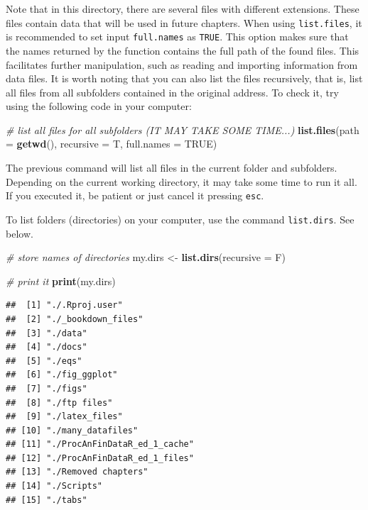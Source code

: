 \documentclass[11pt,]{book}
\newenvironment{Shaded}{\begin{snugshade}}{\end{snugshade}}
\newcommand{\KeywordTok}[1]{\textcolor[rgb]{0.27,0.27,0.27}{\textbf{#1}}}
\newcommand{\DataTypeTok}[1]{\textcolor[rgb]{0.27,0.27,0.27}{#1}}
\newcommand{\StringTok}[1]{\textcolor[rgb]{0.5,0.5,0.5}{#1}}
\newcommand{\CommentTok}[1]{\textcolor[rgb]{0.56,0.35,0.01}{\textit{#1}}}
\newcommand{\OtherTok}[1]{\textcolor[rgb]{0.56,0.35,0.01}{#1}}
\newcommand{\NormalTok}[1]{#1}
\begin{document}
Note that in this directory, there are several files with different
extensions. These files contain data that will be used in future
chapters. When using \texttt{list.files}, it is recommended to set input
\texttt{full.names} as \texttt{TRUE}. This option makes sure that the
names returned by the function contains the full path of the found
files. This facilitates further manipulation, such as reading and
importing information from data files. It is worth noting that you can
also list the files recursively, that is, list all files from all
subfolders contained in the original address. To check it, try using the
following code in your computer:

\begin{Shaded}
\begin{Highlighting}[]
\CommentTok{# list all files for all subfolders (IT MAY TAKE SOME TIME...)}
\KeywordTok{list.files}\NormalTok{(}\DataTypeTok{path =} \KeywordTok{getwd}\NormalTok{(), }\DataTypeTok{recursive =}\NormalTok{ T, }\DataTypeTok{full.names =} \OtherTok{TRUE}\NormalTok{)}
\end{Highlighting}
\end{Shaded}

The previous command will list all files in the current folder and
subfolders. Depending on the current working directory, it may take some
time to run it all. If you executed it, be patient or just cancel it
pressing \texttt{esc}.

To list folders (directories) on your computer, use the command
\texttt{list.dirs}. See below. 

\begin{Shaded}
\begin{Highlighting}[]
\CommentTok{# store names of directories}
\NormalTok{my.dirs <-}\StringTok{ }\KeywordTok{list.dirs}\NormalTok{(}\DataTypeTok{recursive =}\NormalTok{ F)}

\CommentTok{# print it}
\KeywordTok{print}\NormalTok{(my.dirs)}
\end{Highlighting}
\end{Shaded}

\begin{verbatim}
##  [1] "./.Rproj.user"              
##  [2] "./_bookdown_files"          
##  [3] "./data"                     
##  [4] "./docs"                     
##  [5] "./eqs"                      
##  [6] "./fig_ggplot"               
##  [7] "./figs"                     
##  [8] "./ftp files"                
##  [9] "./latex_files"              
## [10] "./many_datafiles"           
## [11] "./ProcAnFinDataR_ed_1_cache"
## [12] "./ProcAnFinDataR_ed_1_files"
## [13] "./Removed chapters"         
## [14] "./Scripts"                  
## [15] "./tabs"
\end{verbatim}
\end{document}
